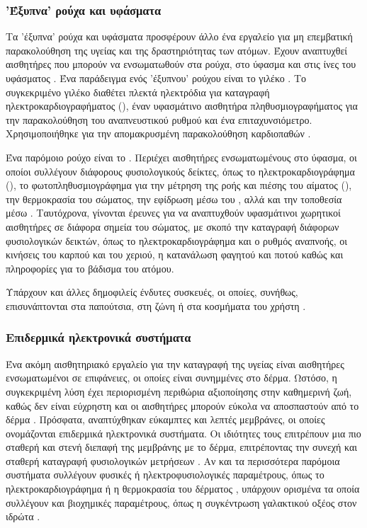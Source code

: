 \subsubsection{'Έξυπνα' ρούχα και υφάσματα}
Τα 'έξυπνα' ρούχα και υφάσματα προσφέρουν άλλο ένα εργαλείο για μη επεμβατική παρακολούθηση της υγείας και της δραστηριότητας των ατόμων.
Έχουν αναπτυχθεί αισθητήρες που μπορούν να ενσωματωθούν στα ρούχα, στο ύφασμα και στις ίνες του υφάσματος \cite{rashidi2012survey}.
Ένα παράδειγμα ενός 'έξυπνου' ρούχου είναι το γιλέκο .
Το συγκεκριμένο γιλέκο διαθέτει πλεκτά ηλεκτρόδια για καταγραφή ηλεκτροκαρδιογραφήματος (), έναν υφασμάτινο αισθητήρα πληθυσμιογραφήματος για την παρακολούθηση του αναπνευστικού ρυθμού και ένα επιταχυνσιόμετρο.
Χρησιμοποιήθηκε για την απομακρυσμένη παρακολούθηση καρδιοπαθών \cite{Rienzo2010}.
\par
Ένα παρόμοιο ρούχο είναι το  .\cite{Pandian2008}
Περιέχει αισθητήρες ενσωματωμένους στο ύφασμα, οι οποίοι συλλέγουν διάφορους φυσιολογικούς δείκτες, όπως το ηλεκτροκαρδιογράφημα (), το φωτοπληθυσμιογράφημα για την μέτρηση της ροής και πιέσης του αίματος (), την θερμοκρασία του σώματος, την εφίδρωση μέσω του , αλλά και την τοποθεσία μέσω .
Ταυτόχρονα, γίνονται έρευνες \cite{Chang2013} για να αναπτυχθούν υφασμάτινοι χωρητικοί αισθητήρες σε διάφορα σημεία του σώματος, με σκοπό την καταγραφή διάφορων φυσιολογικών δεικτών, όπως το ηλεκτροκαρδιογράφημα και ο ρυθμός αναπνοής, οι κινήσεις του καρπού και του χεριού, η κατανάλωση φαγητού και ποτού καθώς και πληροφορίες για το βάδισμα του ατόμου.
\par
Υπάρχουν και άλλες δημοφιλείς ένδυτες συσκευές, οι οποίες, συνήθως, επισυνάπτονται στα παπούτσια, στη ζώνη ή στα κοσμήματα του χρήστη \cite{Brodie2016}\cite{Achkar2016}\cite{Sardini2010}\cite{Sim2011}.
\subsubsection{Επιδερμικά ηλεκτρονικά συστήματα}
Ένα ακόμη αισθητηριακό εργαλείο για την καταγραφή της υγείας είναι αισθητήρες ενσωματωμένοι σε επιφάνειες, οι οποίες είναι συνημμένες στο δέρμα. 
Ωστόσο, η συγκεκριμένη λύση έχει περιορισμένη περιθώρια αξιοποίησης στην καθημερινή ζωή, καθώς δεν είναι εύχρηστη και οι αισθητήρες μπορούν εύκολα να αποσπαστούν από το δέρμα \cite{Yeo2013}.
Πρόσφατα, αναπτύχθηκαν εύκαμπτες και λεπτές μεμβράνες, οι οποίες ονομάζονται επιδερμικά ηλεκτρονικά συστήματα.
Οι ιδιότητες τους επιτρέπουν μια πιο σταθερή και στενή διεπαφή της μεμβράνης με το δέρμα, επιτρέποντας την συνεχή και σταθερή καταγραφή φυσιολογικών μετρήσεων \cite{Imani2016}.
Αν και τα περισσότερα παρόμοια συστήματα συλλέγουν φυσικές ή ηλεκτροφυσιολογικές παραμέτρους, όπως το ηλεκτροκαρδιογράφημα ή η θερμοκρασία του δέρματος \cite{Bian2014}\cite{Webb2013}\cite{Yeo2013}, υπάρχουν ορισμένα τα οποία συλλέγουν και βιοχημικές παραμέτρους, όπως η συγκέντρωση γαλακτικού οξέος στον ιδρώτα \cite{Imani2016}.
